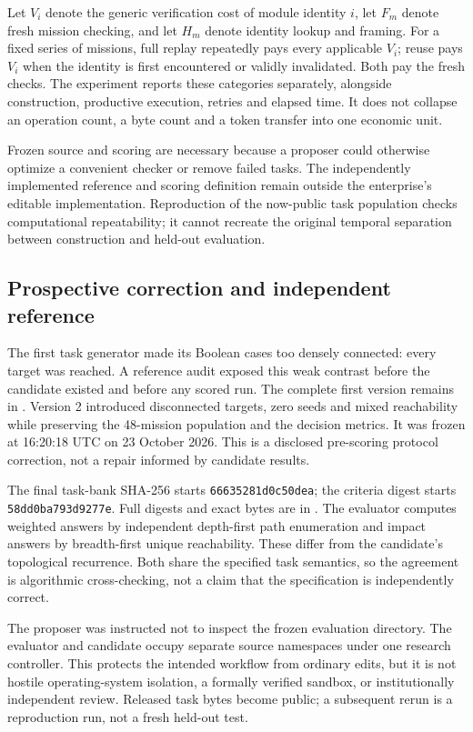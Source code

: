 \documentclass[11pt]{article}
\newcommand{\filename}[1]{\path{#1}}
\begin{document}
Let $V_i$ denote the generic verification cost of module identity $i$, let $F_m$ denote fresh mission checking, and let $H_m$ denote identity lookup and framing. For a fixed series of missions, full replay repeatedly pays every applicable $V_i$; reuse pays $V_i$ when the identity is first encountered or validly invalidated. Both pay the fresh checks. The experiment reports these categories separately, alongside construction, productive execution, retries and elapsed time. It does not collapse an operation count, a byte count and a token transfer into one economic unit.

Frozen source and scoring are necessary because a proposer could otherwise optimize a convenient checker or remove failed tasks. The independently implemented reference and scoring definition remain outside the enterprise's editable implementation. Reproduction of the now-public task population checks computational repeatability; it cannot recreate the original temporal separation between construction and held-out evaluation.


\subsection{Prospective correction and independent reference}

The first task generator made its Boolean cases too densely connected: every target was reached. A reference audit exposed this weak contrast before the candidate existed and before any scored run. The complete first version remains in \filename{study/evaluation/prescore-v1/}. Version 2 introduced disconnected targets, zero seeds and mixed reachability while preserving the 48-mission population and the decision metrics. It was frozen at 16:20:18 UTC on 23 October 2026. This is a disclosed pre-scoring protocol correction, not a repair informed by candidate results.

The final task-bank SHA-256 starts \texttt{66635281d0c50dea}; the criteria digest starts \texttt{58dd0ba793d9277e}. Full digests and exact bytes are in \filename{study/evaluation/FREEZE.json}. The evaluator computes weighted answers by independent depth-first path enumeration and impact answers by breadth-first unique reachability. These differ from the candidate's topological recurrence. Both share the specified task semantics, so the agreement is algorithmic cross-checking, not a claim that the specification is independently correct.

The proposer was instructed not to inspect the frozen evaluation directory. The evaluator and candidate occupy separate source namespaces under one research controller. This protects the intended workflow from ordinary edits, but it is not hostile operating-system isolation, a formally verified sandbox, or institutionally independent review. Released task bytes become public; a subsequent rerun is a reproduction run, not a fresh held-out test.
\end{document}
